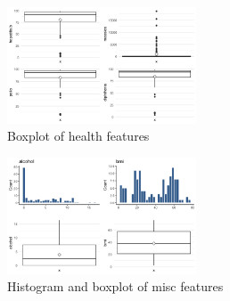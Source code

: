 \begin{figure}[H]
	\centering
	\includegraphics[width=0.5\textwidth]{figures/eda/boxplot_health_features.png}
	\caption{Boxplot of health features}
	\label{fig:boxplot_health_features}
\end{figure}


\begin{figure}[H]
	\centering
	\includegraphics[width=0.5\textwidth]{figures/eda/histogram_boxplot_misc_features.png}
	\caption{Histogram and boxplot of misc features}
	\label{fig:histogram_boxplot_misc_features}
\end{figure}